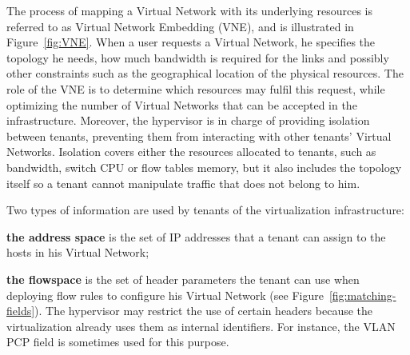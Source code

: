 The process of mapping a Virtual Network with its underlying resources is referred to as Virtual Network Embedding (VNE), and is illustrated in Figure~\ref{fig:VNE}.
When a user requests a Virtual Network, he specifies the topology he needs, how much bandwidth is required for the links and possibly other constraints such as the geographical location of the physical resources.
The role of the VNE is to determine which resources may fulfil this request, while optimizing the number of Virtual Networks that can be accepted in the infrastructure.
Moreover, the hypervisor is in charge of providing isolation between tenants, preventing them from interacting with other tenants' Virtual Networks. Isolation covers either the resources allocated to tenants, such as bandwidth, switch CPU or flow tables memory, but it also includes the topology itself so a tenant cannot manipulate traffic that does not belong to him.

Two types of information are used by tenants of the virtualization infrastructure:
\begin{inparaenum}[a)]
\item \textbf{the address space} is the set of IP addresses that a tenant can assign to the hosts in his Virtual Network;
\item \textbf{the flowspace} is the set of header parameters the tenant can use when deploying flow rules to configure his Virtual Network (see Figure~\ref{fig:matching-fields}). The hypervisor may restrict the use of certain headers because the virtualization already uses them as internal identifiers. For instance, the VLAN PCP field is sometimes used for this purpose.
\end{inparaenum}

